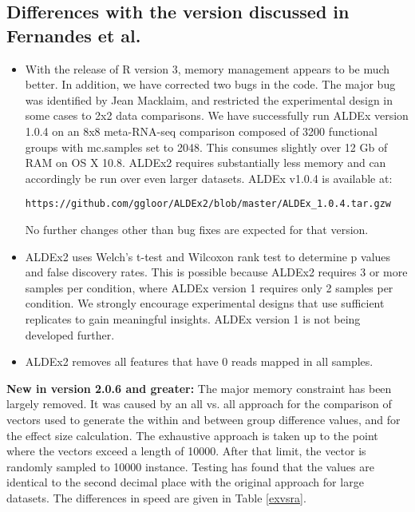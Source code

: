\documentclass[11pt]{amsart}
\begin{document}
\subsection{Differences with the version discussed in Fernandes et al.\cite{fernandes:2013}}  
\begin{itemize}
\item With the release of R version 3, memory management appears to be much better. In addition, we have corrected two bugs in the code. The major bug was identified by Jean Macklaim, and restricted the experimental design in some cases to 2x2 data comparisons. We have successfully run ALDEx version 1.0.4 on an 8x8 meta-RNA-seq comparison composed of 3200 functional groups with mc.samples set to 2048. This consumes slightly over 12 Gb of RAM on OS X 10.8. ALDEx2  requires substantially less memory and can accordingly be run over even larger datasets. ALDEx v1.0.4 is available at: \begin{verbatim}https://github.com/ggloor/ALDEx2/blob/master/ALDEx_1.0.4.tar.gzw\end{verbatim} No further changes other than bug fixes are expected for that version. 

\item ALDEx2 uses Welch's t-test and Wilcoxon rank test to determine p values and false discovery rates. This is possible because ALDEx2 requires 3 or more samples per condition, where ALDEx version 1 requires only 2 samples per condition. We strongly encourage experimental designs that use sufficient replicates to gain meaningful insights. ALDEx version 1 is not being developed further.

\item ALDEx2 removes all features that have 0 reads mapped in all samples.
\end{itemize}
\textbf{New in version 2.0.6 and greater:} The major memory constraint has been largely removed. It was caused by an all vs. all approach for the comparison of vectors used to generate the within and between group difference values, and for the effect size calculation. The exhaustive approach is taken up to the point where the vectors exceed a length of 10000. After that limit, the vector is randomly sampled to 10000 instance. Testing has found that the values are identical to the second decimal place with the original approach for large datasets. The differences in speed are given in Table \ref{exvsra}.
\end{document}

